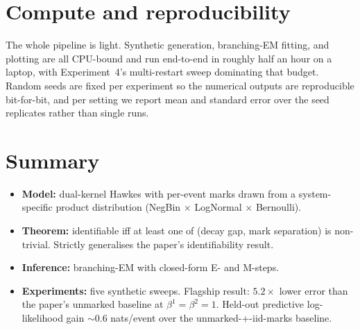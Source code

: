 \documentclass[11pt]{article}
\begin{document}
\section{Compute and reproducibility}

The whole pipeline is light. Synthetic generation, branching-EM fitting, and plotting are all CPU-bound and run end-to-end in roughly half an hour on a laptop, with Experiment~4's multi-restart sweep dominating that budget. Random seeds are fixed per experiment so the numerical outputs are reproducible bit-for-bit, and per setting we report mean and standard error over the seed replicates rather than single runs.

\section{Summary}

\begin{itemize}[leftmargin=*,nosep]
\item \textbf{Model:} dual-kernel Hawkes with per-event marks drawn from a system-specific product distribution (NegBin $\times$ LogNormal $\times$ Bernoulli).
\item \textbf{Theorem:} identifiable iff at least one of (decay gap, mark separation) is non-trivial. Strictly generalises the paper's identifiability result.
\item \textbf{Inference:} branching-EM with closed-form E- and M-steps.
\item \textbf{Experiments:} five synthetic sweeps. Flagship result: $5.2\times$ lower error than the paper's unmarked baseline at $\beta^1 = \beta^2 = 1$. Held-out predictive log-likelihood gain $\sim 0.6$ nats/event over the unmarked-+-iid-marks baseline.
\end{itemize}
\end{document}
